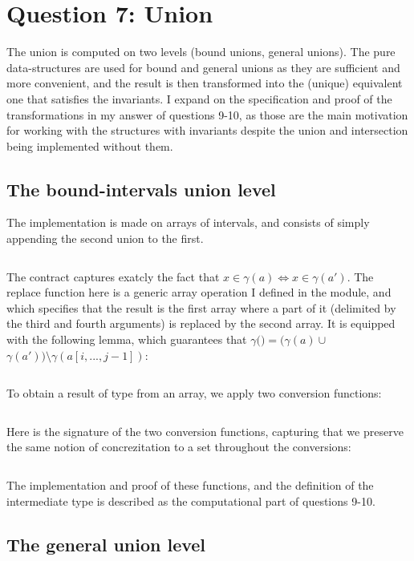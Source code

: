 \section{Question 7: Union}\label{q6}
%
The union is computed on two levels (bound unions, general unions).
The pure data-structures are used for bound and general unions as they are sufficient
and more convenient,
%
and the result is then transformed into the (unique) equivalent one that satisfies
the invariants. I expand on the specification and proof of the transformations in my
answer of questions 9-10, as those are the main motivation for working with the
structures with invariants despite the union and intersection being implemented
without them.


\subsection{The bound-intervals union level}

The implementation is made on arrays of intervals, and consists of simply appending
the second union to the first.
%
\inputminted{\whyml}{why3code/gen_union_union.mlw}
%
The contract captures exatcly the fact that $x\in \gamma(a) \iff x\in\gamma(a')$. The
replace function here is a generic array operation I defined in the 
module, and which specifies that the result is the first array where a part of it
(delimited by the third and fourth arguments) is replaced by the second array.
%
It is equipped with the following lemma, which guarantees that
$\gamma($$) = (\gamma(a) \cup$
$\gamma(a'))\setminus\gamma(a[i,...,j-1])$:
\inputminted{\whyml}{why3code/replace_lemma.mlw}

To obtain a result of type  from an array, we apply two
conversion functions:
\inputminted{\whyml}{why3code/union_union.mlw}

Here is the signature of the two conversion functions, capturing that we preserve the
same notion of concrezitation to a set throughout the conversions:
\inputminted{\whyml}{why3code/bound_convs_contracts.mlw}

The implementation and proof of these functions, and the definition of the
 intermediate type is described as the computational part of
questions 9-10.

\subsection{The general union level}

